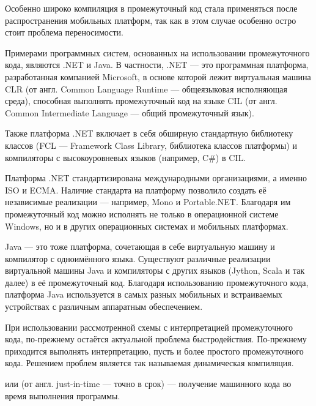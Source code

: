 Особенно широко компиляция в промежуточный код стала применяться после
распространения мобильных платформ, так как в этом случае особенно
остро стоит проблема переносимости.


Примерами программных систем, основанных на использовании
промежуточного кода, являются .NET и Java. В частности, .NET — это
программная платформа, разработанная компанией Microsoft, в основе
которой лежит виртуальная машина CLR (от англ. Common Language Runtime
— общеязыковая исполняющая среда), способная выполнять промежуточный
код на языке CIL (от англ. Common Intermediate Language — общий
промежуточный язык).

Также платформа .NET включает в себя обширную стандартную библиотеку
классов (FCL — Framework Class Library, библиотека классов платформы)
и компиляторы с высокоуровневых языков (например, C\#) в CIL.

Платформа .NET стандартизирована международными организациями, а
именно ISO и ECMA. Наличие стандарта на платформу позволило создать её
независимые реализации — например, Mono и Portable.NET. Благодаря им
промежуточный код можно исполнять не только в операционной системе
Windows, но и в других операционных системах и мобильных платформах.

Java — это тоже платформа, сочетающая в себе виртуальную машину и
компилятор с одноимённого языка. Существуют различные реализации
виртуальной машины Java и компиляторы с других языков (Jython, Scala и
так далее) в её промежуточный код. Благодаря использованию
промежуточного кода, платформа Java используется в самых разных
мобильных и встраиваемых устройствах с различным аппаратным
обеспечением.


При использовании рассмотренной схемы с интерпретацией промежуточного
кода, по-прежнему остаётся актуальной проблема быстродействия.
По-прежнему приходится выполнять интерпретацию, пусть и более простого
промежуточного кода. Решением проблем является так называемая
динамическая компиляция.

\begin{defn}
   или
   (от англ. just-in-time — точно
  в срок) — получение машинного кода во время выполнения программы.
\end{defn}


